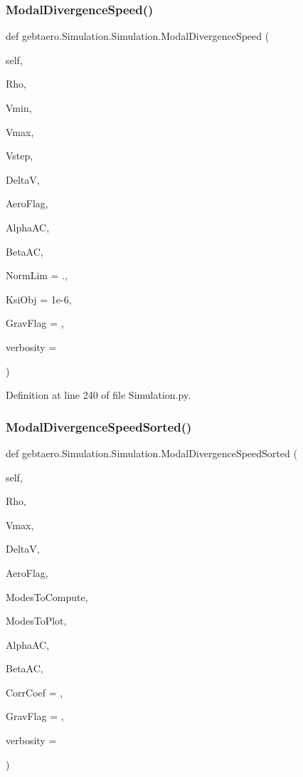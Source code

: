 \subsubsection{\texorpdfstring{Modal\+Divergence\+Speed()}{ModalDivergenceSpeed()}}
{\footnotesize\ttfamily def gebtaero.\+Simulation.\+Simulation.\+Modal\+Divergence\+Speed (\begin{DoxyParamCaption}\item[{}]{self,  }\item[{}]{Rho,  }\item[{}]{Vmin,  }\item[{}]{Vmax,  }\item[{}]{Vstep,  }\item[{}]{DeltaV,  }\item[{}]{Aero\+Flag,  }\item[{}]{Alpha\+AC,  }\item[{}]{Beta\+AC,  }\item[{}]{Norm\+Lim = {.},  }\item[{}]{Ksi\+Obj = {\ttfamily 1e-\/6},  }\item[{}]{Grav\+Flag = {},  }\item[{}]{verbosity = {} }\end{DoxyParamCaption})}



Definition at line 240 of file Simulation.\+py.

\mbox{\label{classgebtaero_1_1_simulation_1_1_simulation_a597d75e677892bd4308a6537a27eedb8}} 
\subsubsection{\texorpdfstring{Modal\+Divergence\+Speed\+Sorted()}{ModalDivergenceSpeedSorted()}}
{\footnotesize\ttfamily def gebtaero.\+Simulation.\+Simulation.\+Modal\+Divergence\+Speed\+Sorted (\begin{DoxyParamCaption}\item[{}]{self,  }\item[{}]{Rho,  }\item[{}]{Vmax,  }\item[{}]{DeltaV,  }\item[{}]{Aero\+Flag,  }\item[{}]{Modes\+To\+Compute,  }\item[{}]{Modes\+To\+Plot,  }\item[{}]{Alpha\+AC,  }\item[{}]{Beta\+AC,  }\item[{}]{Corr\+Coef = {},  }\item[{}]{Grav\+Flag = {},  }\item[{}]{verbosity = {} }\end{DoxyParamCaption})}




